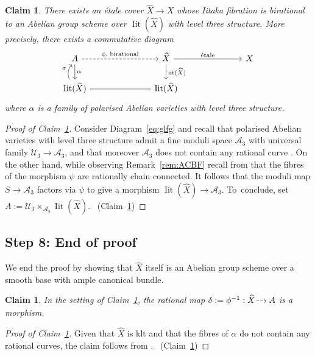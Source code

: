 \documentclass[JEP,XML,SOM,Unicode,published]{cedram}
\let\scr\mathscr
\let\ts\relax
\newcommand{\dradpl}{{\hspace*{-2.5mm}\begin{tikzcd}[ampersand replacement=\&,column sep = scriptsize]\mbox{}\ar[r,dashed]\&\mbox{}\end{tikzcd}\hspace*{-2.5mm}}}
\newcommand{\dratst}{{\hspace*{-2.5mm}\begin{tikzcd}[ampersand replacement=\&,column sep = small]\mbox{}\ar[r,dashed]\&\mbox{}\end{tikzcd}\hspace*{-2mm}}}
\let\drascst\dratst
\newcommand{\dra}{\mathchoice{\dradpl}{\dratst}{\drascst}{\drascst}}
\let\dasharrow\dra
\theoremstyle{plain}
\newtheorem{claim}[thm]{Claim}
\theoremstyle{definition}
\numberwithin{equation}{thm}
\numberwithin{enumi}{thm}
\DeclareMathOperator{\iit}{iit}
\DeclareMathOperator{\Iit}{Iit}
\newcommand{\sA}{\scr{A}}
\newcommand{\sU}{\scr{U}}
\let\what\widehat
\begin{document}
\begin{claim}\label{claim:glfg2}
There exists an étale cover $\what{X} \to X$ whose Iitaka fibration is
birational to an Abelian group scheme over $\Iit(\what{X})$ with level three
structure. More precisely, there exists a commutative diagram
\begin{equation}\label{eq:glfg2}
\begin{tikzcd}[column sep=2.5cm]
A \ar[r, dashed, "\ts\phi\text{, birational}"] \ar[d, "\ts\alpha"] & \what{X} \ar[d, "\ts\iit(\what{X})"] \ar[r, "\ts\text{étale}" ]& X \\
\Iit(\what{X}) \ar[r, equal] \ar[u, bend left, "\ts\sigma"] & \Iit(\what{X})
\end{tikzcd}
\end{equation}
where $\alpha$ is a family of polarised Abelian varieties with level three
structure.
\end{claim}
\begin{proof}[Proof of Claim~\ref{claim:glfg2}]
Consider Diagram~\eqref{eq:glfg} and recall that polarised Abelian varieties
with level three structure admit a fine moduli space $\sA_3$ with universal
family $\sU_3 \to\sA_3$, and that moreover $\sA_3$ does not contain any rational
curve \cite[Lem.\,5.9.3]{Kollar93}. On the other hand, while observing
Remark~\ref{rem:ACBF} recall from \cite[Cor.\,1.5]{HMcK07} that the fibres of
the morphism $\psi$ are rationally chain connected. It follows that the moduli
map $S \to \sA_3$ factors via $\psi$ to give a morphism $\Iit(\what{X}) \to \sA_3$. To~conclude, set $A := \sU_3 \times_{\sA_3} \Iit(\what{X})$.
\qedhere~\mbox{(Claim~\ref{claim:glfg2})}
\end{proof}

\subsection*{Step 8: End of proof}

We end the proof by showing that $\what{X}$ itself is an Abelian group scheme
over a smooth base with ample canonical bundle.

\begin{claim}\label{claim:6-38}
In the setting of Claim~\ref{claim:glfg2}, the rational map
$\delta := \phi^{-1} : \what{X} \dasharrow A$ is a morphism.
\end{claim}
\begin{proof}[Proof of Claim~\ref{claim:6-38}]
Given that $\what{X}$ is klt and that the fibres of $\alpha$ do not contain any
rational curves, the claim follows from \cite[Cor.\,1.6]{HMcK07}.
\qedhere~\mbox{(Claim~\ref{claim:6-38})}
\end{proof}
\end{document}
